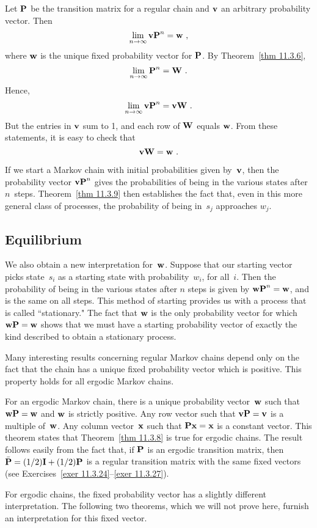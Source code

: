 \begin{theorem}\label{thm 11.3.9}
Let ${\mbox{\bf P}\/}$ be the transition matrix for a regular chain and ${\mbox{\bf v}\/}$ an
arbitrary
probability vector.  Then
$$
\lim_{n \to \infty} {\mbox{\bf v}\/} {\mbox{\bf P}\/}^n = {\mbox{\bf w}\/}\ ,
$$
where ${\mbox{\bf w}\/}$ is the unique fixed probability vector for ${\mbox{\bf P}\/}$.
\proof
By Theorem~\ref{thm 11.3.6},
$$
\lim_{n \to \infty} \mat{P}^n = \mat {W}\ .
$$
Hence,
$$
\lim_{n \to \infty} {\mbox{\bf v}\/} {\mbox{\bf P}\/}^n = {\mbox{\bf v}\/} {\mbox{\bf W}\/}\ .
$$
But the entries in ${\mbox{\bf v}\/}$ sum to 1, and each row of ${\mbox{\bf W}\/}$ equals ${\mbox{\bf w}\/}$.
From these statements, it is easy to check that
$$
{\mbox{\bf v}\/} {\mbox{\bf W}\/} = {\mbox{\bf w}\/}\ .
$$
\end{theorem}

If we start a Markov chain with initial probabilities given by~${\mbox{\bf v}\/}$, then
the 
probability vector ${\mbox{\bf v}\/}
{\mbox{\bf P}\/}^n$ gives the probabilities of being in the various states after
$n$~steps. 
Theorem~\ref{thm 11.3.9} then establishes the fact that, even in this more
general class of
processes, the probability of being in~$s_j$ approaches $w_j$.

\subsection*{Equilibrium}
We also obtain a new interpretation for~${\mbox{\bf w}\/}$.  Suppose that our 
starting vector picks state~$s_i$ as a starting state with probability~$w_i$,
for all~$i$.  Then the probability of being in the various states after $n$
steps is given by ${\mbox{\bf w}\/} {\mbox{\bf P}\/}^n = {\mbox{\bf w}\/}$, and is the same on all
steps. 
This method of starting provides us with a process that is called
``stationary."
The fact that ${\mbox{\bf w}\/}$ is the only probability vector for which ${\mbox{\bf w}\/} {\mbox{\bf P}\/} = 
{\mbox{\bf w}\/}$ shows that we must have a starting probability vector of exactly the
kind 
described to obtain a stationary process.
\par
Many interesting results concerning regular Markov chains depend only on the
fact that the chain has a unique fixed probability vector which is positive. 
This property holds for all ergodic Markov chains.

\begin{theorem}\label{thm 11.3.10}
For an ergodic Markov chain, there is a unique probability vector~${\mbox{\bf w}\/}$
such
that ${\mbox{\bf w}\/} {\mbox{\bf P}\/} = {\mbox{\bf w}\/}$ and ${\mbox{\bf w}\/}$ is strictly positive.  Any
row 
vector such that ${\mbox{\bf v}\/} {\mbox{\bf P}\/} = {\mbox{\bf v}\/}$ is a multiple of~${\mbox{\bf w}\/}$. 
Any column
vector~${\mbox{\bf x}\/}$ such that ${\mbox{\bf P}\/} {\mbox{\bf x}\/} = {\mbox{\bf x}\/}$ is a constant vector.
\proof
This theorem states that Theorem~\ref{thm 11.3.8} is true for ergodic chains.
The result follows easily from the fact that, if ${\mbox{\bf P}\/}$ is an ergodic 
transition matrix, then $\bar{{\mbox{\bf P}\/}} = (1/2){\mbox{\bf I}\/} + (1/2){\mbox{\bf P}\/}$ is a 
regular transition matrix with the same fixed vectors (see Exercises~\ref{exer
11.3.24}--\ref{exer 11.3.27}).
\end{theorem}
\par
For ergodic chains, the fixed probability vector has a slightly different
interpretation.  The following two theorems, which we will not prove here,
furnish an interpretation for this fixed vector.

